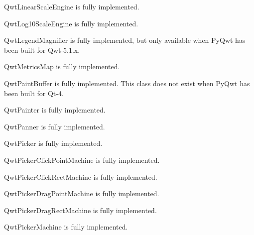\documentclass{manual}
\begin{document}
{\begin{classdesc*}{QwtLinearScaleEngine}
is fully implemented.
\end{classdesc*}

\begin{classdesc*}{QwtLog10ScaleEngine}
is fully implemented.
\end{classdesc*}

\begin{classdesc*}{QwtLegendMagnifier}
  is fully implemented, but only available when PyQwt has been built for
  Qwt-5.1.x. 
\end{classdesc*}

\begin{classdesc*}{QwtMetricsMap}
is fully implemented.
\end{classdesc*}

\begin{classdesc*}{QwtPaintBuffer}
  is fully implemented.
  This class does not exist when PyQwt has been built for Qt-4.
\end{classdesc*}

\begin{classdesc*}{QwtPainter}
  is fully implemented.
\end{classdesc*}

\begin{classdesc*}{QwtPanner}
  is fully implemented.
\end{classdesc*}

\begin{classdesc*}{QwtPicker}
  is fully implemented.
\end{classdesc*}

\begin{classdesc*}{QwtPickerClickPointMachine}
  is fully implemented.
\end{classdesc*}

\begin{classdesc*}{QwtPickerClickRectMachine}
  is fully implemented.
\end{classdesc*}

\begin{classdesc*}{QwtPickerDragPointMachine}
  is fully implemented.
\end{classdesc*}

\begin{classdesc*}{QwtPickerDragRectMachine}
  is fully implemented.
\end{classdesc*}

\begin{classdesc*}{QwtPickerMachine}
  is fully implemented.
\end{classdesc*}

}
\end{document}

